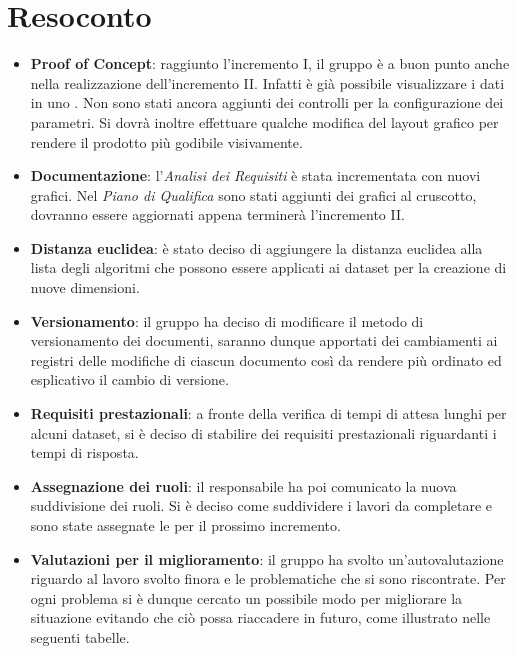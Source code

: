 \section{Resoconto}
\begin{itemize}
\item \textbf{Proof of Concept}: raggiunto l'incremento I, il gruppo è a buon punto anche nella realizzazione dell'incremento II. Infatti è già possibile visualizzare i dati in uno . Non sono stati ancora aggiunti dei controlli per la configurazione dei parametri. Si dovrà inoltre effettuare qualche modifica del layout grafico per rendere il prodotto più godibile visivamente. 

\item\textbf{Documentazione}: l'\textit{Analisi dei Requisiti} è stata incrementata con nuovi grafici. Nel \textit{Piano di Qualifica} sono stati aggiunti dei grafici al cruscotto, dovranno essere aggiornati appena terminerà l'incremento II.

\item\textbf{Distanza euclidea}: è stato deciso di aggiungere la distanza euclidea alla lista degli algoritmi che possono essere applicati ai dataset per la creazione di nuove dimensioni.

\item\textbf{Versionamento}: il gruppo ha deciso di modificare il metodo di versionamento dei documenti, saranno dunque apportati dei cambiamenti ai registri delle modifiche di ciascun documento così da rendere più ordinato ed esplicativo il cambio di versione.

\item \textbf{Requisiti prestazionali}: a fronte della verifica di tempi di attesa lunghi per alcuni dataset, si è deciso di stabilire dei requisiti prestazionali riguardanti i tempi di risposta.

\item \textbf{Assegnazione dei ruoli}: il responsabile ha poi comunicato la nuova suddivisione dei ruoli. Si è deciso come suddividere i lavori da completare e sono state assegnate le  per il prossimo incremento.

\item\textbf{Valutazioni per il miglioramento}: il gruppo ha svolto un'autovalutazione riguardo al lavoro svolto finora e le problematiche che si sono riscontrate. Per ogni problema si è dunque cercato un possibile modo per migliorare la situazione evitando che ciò possa riaccadere in futuro, come illustrato nelle seguenti tabelle.


\end{itemize}
